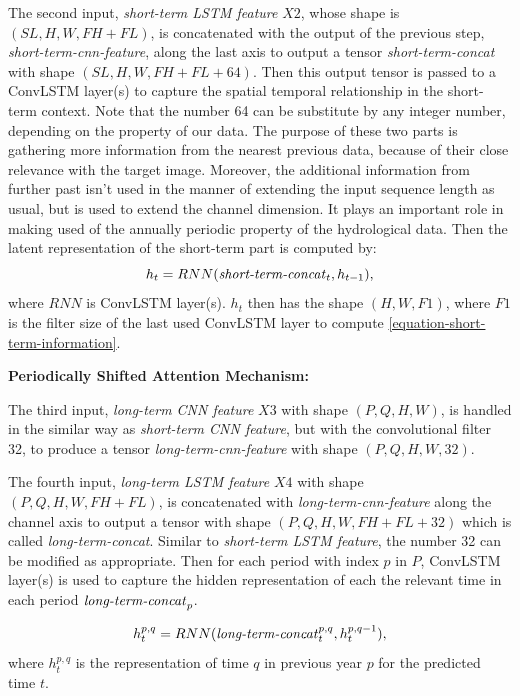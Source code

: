 The second input, \textit{short-term LSTM feature} $X2$, whose shape is $(SL, H, W, FH + FL)$, is concatenated with the output of the previous step, \textit{short-term-cnn-feature}, along the last axis to output a tensor \textit{short-term-concat} with shape $(SL, H, W, FH + FL + 64)$. Then this output tensor is passed to a ConvLSTM layer(s) to capture the spatial temporal relationship in the short-term context. Note that the number 64 can be substitute by any integer number, depending on the property of our data. The purpose of these two parts is gathering more information from the nearest previous data, because of their close relevance with the target image. Moreover, the additional information from further past isn't used in the manner of extending the input sequence length as usual, but is used to extend the channel dimension. It plays an important role in making used of the annually periodic property of the hydrological data. Then the latent representation of the short-term part is computed by:
\[ h_t = RNN(\mbox{\textit{short-term-concat}}_t, h_{t-1}), \label{equation-short-term-information}\]
where $RNN$ is ConvLSTM layer(s). $h_t$ then has the shape $(H, W, F1)$, where $F1$ is the filter size of the last used ConvLSTM layer to compute \eqref{equation-short-term-information}. 

\textbf{Periodically Shifted Attention Mechanism:}

The third input, \textit{long-term CNN feature} $X3$ with shape $(P, Q, H, W)$, is handled in the similar way as \textit{short-term CNN feature}, but with the convolutional filter 32, to produce a tensor \textit{long-term-cnn-feature} with shape $(P, Q, H, W, 32)$. 

The fourth input, \textit{long-term LSTM feature} $X4$ with shape $(P, Q, H, W, FH + FL)$, is concatenated with \textit{long-term-cnn-feature} along the channel axis to output a tensor with shape $(P, Q, H, W, FH + FL + 32)$ which is called \textit{long-term-concat}. Similar to \textit{short-term LSTM feature}, the number 32 can be modified as appropriate. Then for each period with index $p$ in $P$, ConvLSTM layer(s) is used to capture the hidden representation of each the relevant time in each period $\mbox{\textit{long-term-concat}}_p$. 

\[ h_t^{p, q} = RNN(\mbox{\textit{long-term-concat}}_t^{p, q}, h_t^{p, q - 1}), \label{equation-long-term-information} \]
where $h_t^{p, q}$ is the representation of time $q$ in previous year $p$ for the predicted time $t$.

